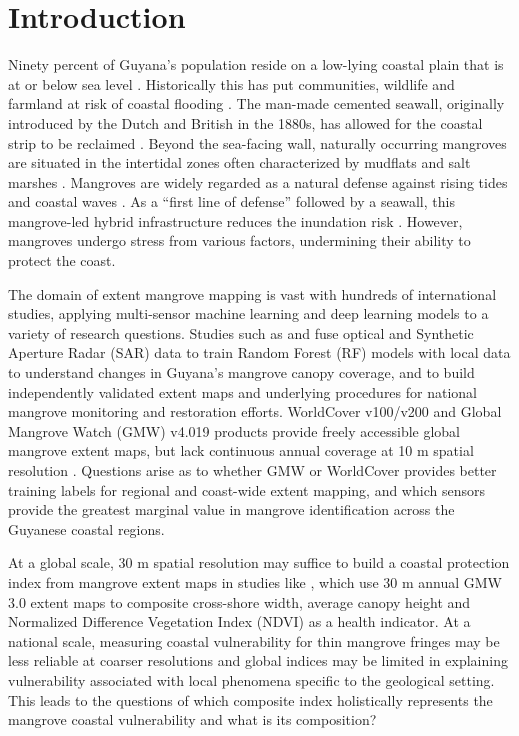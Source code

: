 \documentclass[final-report]{report-template}
\begin{document}
\section{Introduction}
Ninety percent of Guyana’s population reside on a low-lying coastal plain that is at or below sea level \parencite{Pelling1999}. Historically this has put communities, wildlife and farmland at risk of coastal flooding \parencite{Lakhan1994}. The man-made cemented seawall, originally introduced by the Dutch and British in the 1880s, has allowed for the coastal strip to be reclaimed \parencite{Bassett2013}. Beyond the sea-facing wall, naturally occurring mangroves are situated in the intertidal zones often characterized by mudflats and salt marshes \parencite{Best2022}. Mangroves are widely regarded as a natural defense against rising tides and coastal waves \parencite{Hernandez2024, Van2023, Blankespoor2017}. As a “first line of defense” followed by a seawall, this mangrove-led hybrid infrastructure reduces the inundation risk \parencite{De2023}.  However, mangroves undergo stress from various factors, undermining their ability to protect the coast. 

The domain of extent mangrove mapping is vast with hundreds of international studies, applying multi-sensor machine learning and deep learning models to a variety of research questions. Studies such as \textcite{Nedd2023} and \textcite{Chan2024} fuse optical and Synthetic Aperture Radar (SAR) data to train Random Forest (RF) models with local data to understand changes in Guyana's mangrove canopy coverage, and to build independently validated extent maps and underlying procedures for national mangrove monitoring and restoration efforts. WorldCover v100/v200 and Global Mangrove Watch (GMW) v4.019 products provide freely accessible global mangrove extent maps, but lack continuous annual coverage at 10 m spatial resolution \parencite{Zanaga2021, Zanaga2020, Bunting2025}. Questions arise as to whether GMW or WorldCover provides better training labels for regional and coast-wide extent mapping, and which sensors provide the greatest marginal value in mangrove identification across the Guyanese coastal regions.

At a global scale, 30 m spatial resolution may suffice to build a coastal protection index from mangrove extent maps in studies like \textcite{Xu2024}, which use 30 m annual GMW 3.0 extent maps to composite cross-shore width, average canopy height and Normalized Difference Vegetation Index (NDVI) as a health indicator. At a national scale, measuring coastal vulnerability for thin mangrove fringes may be less reliable at coarser resolutions and global indices may be limited in explaining vulnerability associated with local phenomena specific to the geological setting. This leads to the questions of which composite index holistically represents the mangrove coastal vulnerability and what is its composition?
\end{document}

